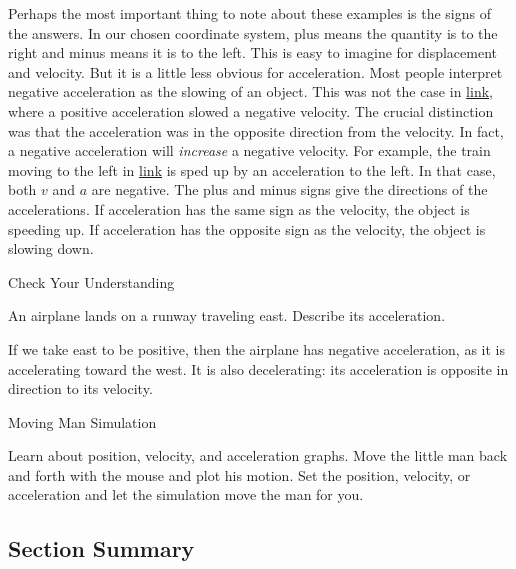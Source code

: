 \documentclass[
]{book}
\newenvironment{note}{}{}
\begin{document}
Perhaps the most important thing to note about these examples is the
signs of the answers. In our chosen coordinate system, plus means the
quantity is to the right and minus means it is to the left. This is easy
to imagine for displacement and velocity. But it is a little less
obvious for acceleration. Most people interpret negative acceleration as
the slowing of an object. This was not the case in
\protect\hyperlink{fs-id4015260}{link}, where a positive
acceleration slowed a negative velocity. The crucial distinction was
that the acceleration was in the opposite direction from the velocity.
In fact, a negative acceleration will \emph{increase} a negative velocity.
For example, the train moving to the left in
\protect\hyperlink{import-auto-id2412190}{link} is sped up by an
acceleration to the left. In that case, both \(v{}\) and \(a{}\) are
negative. The plus and minus signs give the directions of the
accelerations. If acceleration has the same sign as the velocity, the
object is speeding up. If acceleration has the opposite sign as the
velocity, the object is slowing down.

\hypertarget{fs-id4121834}{}
Check Your Understanding

\leavevmode\hypertarget{fs-id4019138}{}%
An airplane lands on a runway traveling east. Describe its acceleration.

\leavevmode\hypertarget{fs-id4071605}{}%
If we take east to be positive, then the airplane has negative
acceleration, as it is accelerating toward the west. It is also
decelerating: its acceleration is opposite in direction to its velocity.

\hypertarget{fs-id4128084}{}
\begin{note}

Moving Man Simulation

Learn about position, velocity, and acceleration graphs. Move the little
man back and forth with the mouse and plot his motion. Set the position,
velocity, or acceleration and let the simulation move the man for you.
{\hfill\break
}

\hypertarget{MovingMan}{}

\end{note}

\hypertarget{fs-id4131829-summary}{}
\hypertarget{section-summary-3}{%
\subsection{Section Summary}\label{section-summary-3}}
\end{document}

